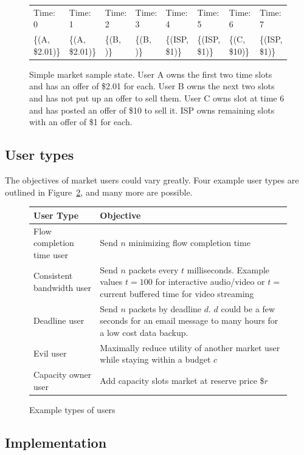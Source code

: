 \begin{figure}
\renewcommand{\arraystretch}{2}
\begin{tabular}[height=3in]{|*{8}{p{\slotwidth}|}}
\hline
Time: 0 & Time: 1 & Time: 2 & Time: 3 & Time: 4 & Time: 5 & Time: 6 & Time: 7 \\
\{(A, \$2.01)\} & \{(A, \$2.01)\} & \{(B, )\} & \{(B, )\} & \{(ISP, \$1)\} & \{(ISP, \$1)\} & \{(C, \$10)\} & \{(ISP, \$1)\} \\
\hline
\end{tabular}
\caption{Simple market sample state. User A owns the first two time slots and has an offer of \$2.01 for each. User B owns the next two slots and has not put up an offer to sell them. User C owns slot at time 6 and has posted an offer of \$10 to sell it. ISP owns remaining slots with an offer of \$1 for each.}
\label{f:simple_market}
\end{figure}

\subsection{User types}
The objectives of market users could vary greatly. Four example user types are outlined in Figure~\ref{f:user_types}, and many more are possible.
\begin{figure}
\begin{tabular}{|p{}|p{}|}
\hline
User Type & Objective \\
\hline
\hline
Flow completion time user & Send $n$ minimizing flow completion time \\
\hline
Consistent bandwidth user & Send $n$ packets every $t$ milliseconds. Example values $t=100$ for interactive audio/video or $t=$ current buffered time for video streaming \\
\hline
Deadline user & Send $n$ packets by deadline $d$. $d$ could be a few seconds for an email message to many hours for a low cost data backup.\\
\hline
Evil user & Maximally reduce utility of another market user while staying within a budget $c$ \\
\hline
Capacity owner user & Add capacity slots market at reserve price \$$r$\\
\hline
\end{tabular}
\caption{Example types of users}
\label{f:user_types}
\end{figure}

\subsection{Implementation}
